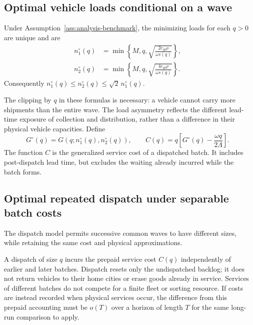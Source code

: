 \subsection{Optimal vehicle loads conditional on a wave}

\begin{proposition}
\label{prop:analysis-loads}
Under Assumption~\ref{ass:analysis-benchmark}, the minimizing loads for each
$q>0$ are unique and are
\begin{align}
 n_1^\circ(q)&=\min\left\{M,q,
                   \sqrt{\frac{2c_H\rho}{\omega s(q)}}\right\},
 \label{eq:analysis-n1}\\
 n_2^\circ(q)&=\min\left\{M,q,
                   \sqrt{\frac{4c_H\rho}{\omega s(q)}}\right\}.
 \label{eq:analysis-n2}
\end{align}
Consequently $n_1^\circ(q)\le n_2^\circ(q)\le\sqrt2\,n_1^\circ(q)$.
\end{proposition}

The clipping by $q$ in these formulas is necessary: a vehicle cannot carry
more shipments than the entire wave. The load asymmetry reflects the different
lead-time exposure of collection and distribution, rather than a difference
in their physical vehicle capacities. Define
\begin{equation}
 G^\circ(q)=G(q;n_1^\circ(q),n_2^\circ(q)),\qquad
 C(q)=q\left[G^\circ(q)-\frac{\omega q}{2\Lambda}\right].
 \label{eq:analysis-dispatch-cost}
\end{equation}
The function $C$ is the generalized service cost of a dispatched batch. It
includes post-dispatch lead time, but excludes the waiting already incurred
while the batch forms.

\subsection{Optimal repeated dispatch under separable batch costs}
\label{subsec:dynamic-wave}

The dispatch model permits successive common waves to have different sizes,
while retaining the same cost and physical approximations.

\begin{assumption}
\label{ass:analysis-accounting}
A dispatch of size $q$ incurs the prepaid service cost $C(q)$ independently
of earlier and later batches. Dispatch resets only the undispatched backlog;
it does not return vehicles to their home cities or erase goods already in
service. Services of different batches do not compete for a finite fleet or
sorting resource. If costs are instead recorded when physical services occur,
the difference from this prepaid accounting must be $o(T)$ over a horizon
of length $T$ for the same long-run comparison to apply.
\end{assumption}

